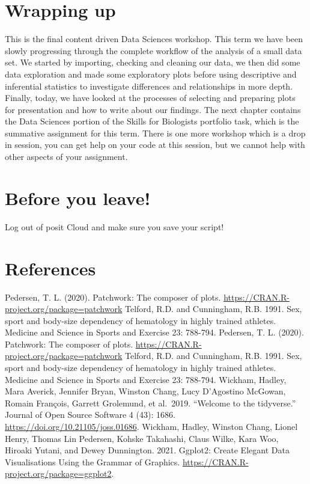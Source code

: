 \documentclass[
]{book}
\begin{document}
\section{Wrapping up}\label{wrapping-up-2}

This is the final content driven Data Sciences workshop. This term we have been slowly progressing through the complete workflow of the analysis of a small data set. We started by importing, checking and cleaning our data, we then did some data exploration and made some exploratory plots before using descriptive and inferential statistics to investigate differences and relationships in more depth. Finally, today, we have looked at the processes of selecting and preparing plots for presentation and how to write about our findings. The next chapter contains the Data Sciences portion of the Skills for Biologists portfolio task, which is the summative assignment for this term. There is one more workshop which is a drop in session, you can get help on your code at this session, but we cannot help with other aspects of your assignment.

\section{Before you leave!}\label{before-you-leave-9}

Log out of posit Cloud and make sure you save your script!

\section{References}\label{references-10}

Pedersen, T. L. (2020). Patchwork: The composer of plots. \url{https://CRAN.R-project.org/package=patchwork}
Telford, R.D. and Cunningham, R.B. 1991. Sex, sport and body-size dependency of hematology in highly trained athletes. Medicine and Science in Sports and Exercise 23: 788-794. Pedersen, T. L. (2020). Patchwork: The composer of plots. \url{https://CRAN.R-project.org/package=patchwork}
Telford, R.D. and Cunningham, R.B. 1991. Sex, sport and body-size dependency of hematology in highly trained athletes. Medicine and Science in Sports and Exercise 23: 788-794.
Wickham, Hadley, Mara Averick, Jennifer Bryan, Winston Chang, Lucy D'Agostino McGowan, Romain François, Garrett Grolemund, et al.~2019. ``Welcome to the tidyverse.'' Journal of Open Source Software 4 (43): 1686. \url{https://doi.org/10.21105/joss.01686}.
Wickham, Hadley, Winston Chang, Lionel Henry, Thomas Lin Pedersen, Kohske Takahashi, Claus Wilke, Kara Woo, Hiroaki Yutani, and Dewey Dunnington. 2021. Ggplot2: Create Elegant Data Visualisations Using the Grammar of Graphics. \url{https://CRAN.R-project.org/package=ggplot2}.
\end{document}
